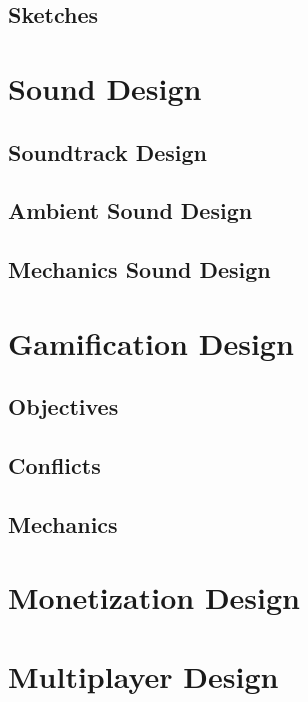 \subsection{Sketches}

\section{Sound Design}
\subsection{Soundtrack Design}
\subsection{Ambient Sound Design}
\subsection{Mechanics Sound Design}

\section{Gamification Design}
\subsection{Objectives}
\subsection{Conflicts}
\subsection{Mechanics}

\section{Monetization Design}

\section{Multiplayer Design}


